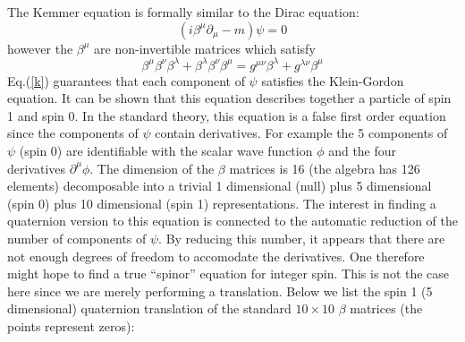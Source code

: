 \vspace*{11mm}


The Kemmer equation is formally similar to the Dirac equation:
\begin{equation}
(i \beta^{\mu} \partial_{\mu} - m ) \psi  = 0
\end{equation}
however the $\beta^{\mu}$ are non-invertible matrices which
satisfy \cite{rom}
\begin{equation} \label{k}
\beta^{\mu} \beta^{\nu} \beta^{\lambda} + \beta^{\lambda} \beta^{\nu}
\beta^{\mu} = g^{\mu \nu} \beta^{\lambda} + g^{\lambda \nu} \beta^{\mu}
\end{equation}
Eq.(\ref{k}) guarantees that each component of $\psi$ satisfies the
Klein-Gordon equation. It can be shown that this equation describes
together a particle of spin 1 and spin 0. In the standard theory, this
equation is a false first order equation since the components of $\psi$
contain derivatives. For example the 5 components of $\psi$ (spin 0)
are identifiable with the scalar wave function $\phi$ and the four
derivatives $\partial^{\mu}\phi$. The dimension of
the $\beta$ matrices is 16 (the
algebra has 126 elements) decomposable into a trivial 1 dimensional (null)
plus 5 dimensional (spin 0) plus 10 dimensional (spin 1) representations.
The interest in finding a quaternion version to this equation is connected
to the automatic reduction of the number of
components of $\psi$. By reducing this number, it appears that there are
not enough degrees of freedom to accomodate the derivatives. One therefore
might hope to find a true ``spinor'' equation for integer spin.
This is not the case here since we are merely performing a
translation. Below we list
the spin 1 (5 dimensional) quaternion translation of the standard
$10 \times 10$ $\beta$ matrices (the points represent zeros):


